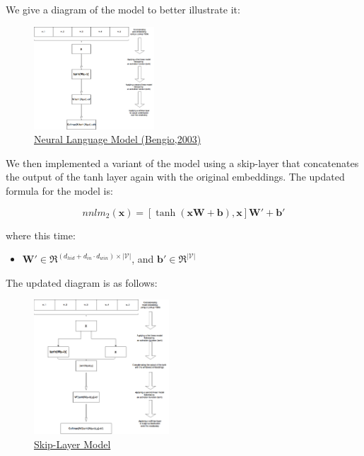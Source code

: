 \documentclass[11pt]{article}
\begin{document}
\noindent We give a diagram of the model to better illustrate it:

\begin{figure}[H]
\begin{center}
    \includegraphics[width=0.4\textwidth]{reg.png}
    \caption{\underline{Neural Language Model (Bengio,2003)}}
\end{center}
\end{figure}

We then implemented a variant of the model using a skip-layer that concatenates the output of the tanh layer again with the original embeddings. The updated formula for the model is:

$$ nnlm_2(\boldsymbol{x}) = [\tanh(\boldsymbol{xW}+\boldsymbol{b}),\boldsymbol{x}]\boldsymbol{W'}+\boldsymbol{b'}$$

where this time:
\begin{itemize}
\item $\boldsymbol{W'}\in \Re^{(d_{hid}+ d_{in}\cdot d_{win})\times |\mathcal{V}|}$, and $\boldsymbol{b'}\in \Re^{|\mathcal{V}|}$
\end{itemize}

The updated diagram is as follows:
\begin{figure}[H]
\begin{center}
    \includegraphics[width=0.45\textwidth]{skip.png}
    \caption{\underline{Skip-Layer Model}}
\end{center}
\end{figure}
\end{document}
